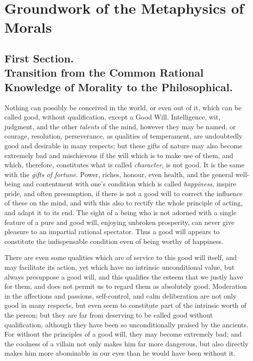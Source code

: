 
\author{Immanuel Kant}
\chapter[Groundwork of the Metaphysics of Morals, excerpt]{Groundwork
of the Metaphysics of Morals}

\section*{First Section.\\\smaller Transition from the Common
Rational Knowledge of Morality to the Philosophical.}

Nothing can possibly be conceived in the world, or even out of it,
which can be called good, without qualification, except a Good Will.
Intelligence, wit, judgment, and the other \textit{talents} of the
mind, however they may be named, or courage, resolution, perseverance,
as qualities of temperament, are undoubtedly good and desirable in
many respects; but these gifts of nature may also become extremely bad
and mischievous if the will which is to make use of them, and which,
therefore, constitutes what is called \textit{character}, is not good.
It is the same with the \textit{gifts of fortune}. Power, riches,
honour, even health, and the general well-being and contentment with
one's condition which is called \textit{happiness}, inspire pride, and
often presumption, if there is not a good will to correct the
influence of these on the mind, and with this also to rectify the
whole principle of acting, and adapt it to its end. The sight of a
being who is not adorned with a single feature of a pure and good
will, enjoying unbroken prosperity, can never give pleasure to an
impartial rational spectator. Thus a good will appears to constitute
the indispensable condition even of being worthy of happiness.

There are even some qualities which are of service to this good will
itself, and may facilitate its action, yet which have no intrinsic
unconditional value, but always presuppose a good will, and this
qualifies the esteem that we justly have for them, and does not permit
us to regard them as absolutely good. Moderation in the affections and
passions, self-control, and calm deliberation are not only good in
many respects, but even seem to constitute part of the intrinsic worth
of the person; but they are far from deserving to be called good
without  qualification, although they have been so
unconditionally praised by the ancients. For without the principles of
a good will, they may become extremely bad; and the coolness of a
villain not only makes him far more dangerous, but also directly makes
him more abominable in our eyes than he would have been without it.

